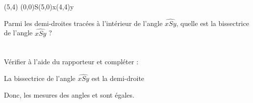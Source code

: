 \begin{multicols}{2}
\begin{center}
\pspicture(5,4)
    \pstGeonode[PointSymbol=none,PosAngle={235,0,45}](0,0){S}(5,0){x}(4,4){y}
     
\endpspicture
\end{center}

\columnbreak

Parmi les demi-droites tracées à l'intérieur de l'angle
$\widehat{xSy}$, quelle est la bissectrice de l'angle
$\widehat{xSy}$ ? \dotfill\\
\null \dotfill\\
\null \dotfill\\
Vérifier à l'aide du rapporteur et compléter :\\
\begin{myenumerate}
    \item La bissectrice de l'angle $\widehat{xSy}$ est la
    demi-droite \dotfill
    \item Donc, les mesures des angles \phantom{blablabla} et
    \phantom{blablabla} sont égales.
\end{myenumerate}
\end{multicols}